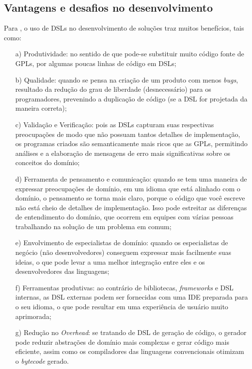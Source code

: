 \subsection{Vantagens e desafios no desenvolvimento}
\label{beneficiosdsl}

Para , o uso de \gls{DSL}s no desenvolvimento de soluções traz muitos benefícios, tais como:

\begin{enumerate}
    \item[a)] Produtividade: no sentido de que pode-se substituir muito código fonte de \gls{GPL}s, por algumas poucas linhas de código em \gls{DSL}s;
    
    \item[b)] Qualidade: quando se pensa na criação de um produto com menos \textit{bugs}, resultado da redução do grau de liberdade (desnecessário) para os programadores, prevenindo a duplicação de código (se a \gls{DSL} for projetada da maneira correta);
    
    \item[c)] Validação e Verificação: pois as \gls{DSL}s capturam suas respectivas preocupações de modo que não possuam tantos detalhes de implementação, os programas criados são semanticamente mais ricos que as \gls{GPL}s, permitindo análises e a elaboração de mensagens de erro mais significativas sobre os conceitos do domínio;
    
    \item[d)] Ferramenta de pensamento e comunicação: quando se tem uma maneira de expressar preocupações de domínio, em um idioma que está alinhado com o domínio, o pensamento se torna mais claro, porque o código que você escreve não está cheio de detalhes de implementação. Isso pode estreitar as diferenças de entendimento do domínio, que ocorrem em equipes com várias pessoas trabalhando na solução de um problema em comum;
    
    \item[e)] Envolvimento de especialistas de domínio: quando os especialistas de negócio (não desenvolvedores) conseguem expressar mais facilmente suas ideias, o que pode levar a uma melhor integração entre eles e os desenvolvedores das linguagens;
    
    \item[f)] Ferramentas produtivas: ao contrário de bibliotecas, \textit{frameworks} e \gls{DSL} internas, as \gls{DSL} externas podem ser fornecidas com uma \gls{IDE} preparada para o seu idioma, o que pode resultar em uma experiência de usuário muito aprimorada;

    \item[g)] Redução no \textit{Overhead}: se tratando de \gls{DSL} de geração de código, o gerador pode reduzir abstrações de domínio mais complexas e gerar código mais eficiente, assim como os compiladores das linguagens convencionais otimizam o \textit{bytecode} gerado.
\end{enumerate}

